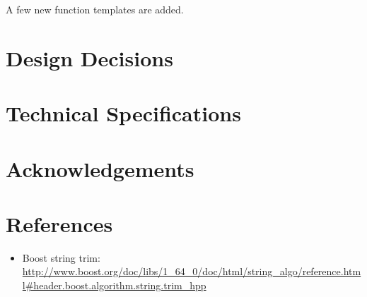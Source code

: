 \documentclass[10pt,a4paper,article]{memoir}
\begin{document}
A few new function templates are added.

\chapter{Design Decisions}
\label{sec:design}

\chapter{Technical Specifications}
\label{sec:spec}

\chapter{Acknowledgements}
\label{sec:acknowledgements}

\chapter{References}
\label{sec:references}

\begin{itemize}
\item Boost string trim: \url{http://www.boost.org/doc/libs/1_64_0/doc/html/string_algo/reference.html#header.boost.algorithm.string.trim_hpp}
\end{itemize}
\end{document}
